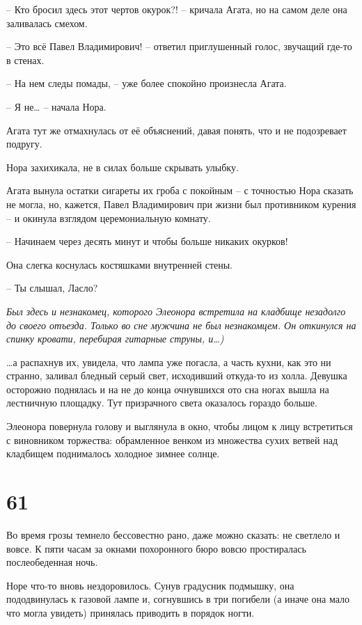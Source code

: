 \documentclass[
  a5paperpaper,
  DIV=11,
  numbers=noendperiod]{scrreprt}
\begin{document}
-- Кто бросил здесь этот чертов окурок?! -- кричала Агата, но на самом
деле она заливалась смехом.

-- Это всё Павел Владимирович! -- ответил приглушенный голос, звучащий
где-то в стенах.

-- На нем следы помады, -- уже более спокойно произнесла Агата.

-- Я не\ldots{} -- начала Нора.

Агата тут же отмахнулась от её объяснений, давая понять, что и не
подозревает подругу.

Нора захихикала, не в силах больше скрывать улыбку.

Агата вынула остатки сигареты их гроба с покойным -- с точностью Нора
сказать не могла, но, кажется, Павел Владимирович при жизни был
противником курения -- и окинула взглядом церемониальную комнату.

-- Начинаем через десять минут и чтобы больше никаких окурков!

Она слегка коснулась костяшками внутренней стены.

-- Ты слышал, Ласло?

\emph{Был здесь и незнакомец, которого Элеонора встретила на кладбище
незадолго до своего отъезда. Только во сне мужчина не был незнакомцем.
Он откинулся на спинку кровати, перебирая гитарные струны, и\ldots)}

\ldots а распахнув их, увидела, что лампа уже погасла, а часть кухни,
как это ни странно, заливал бледный серый свет, исходивший откуда-то из
холла. Девушка осторожно поднялась и на не до конца очнувшихся ото сна
ногах вышла на лестничную площадку. Тут призрачного света оказалось
гораздо больше.

Элеонора повернула голову и выглянула в окно, чтобы лицом к лицу
встретиться с виновником торжества: обрамленное венком из множества
сухих ветвей над кладбищем поднималось холодное зимнее солнце.

\section*{61}\label{61}


Во время грозы темнело бессовестно рано, даже можно сказать: не светлело
и вовсе. К пяти часам за окнами похоронного бюро вовсю простиралась
послеобеденная ночь.

Норе что-то вновь нездоровилось. Сунув градусник подмышку, она
пододвинулась к газовой лампе и, согнувшись в три погибели (а иначе она
мало что могла увидеть) принялась приводить в порядок ногти.
\end{document}

